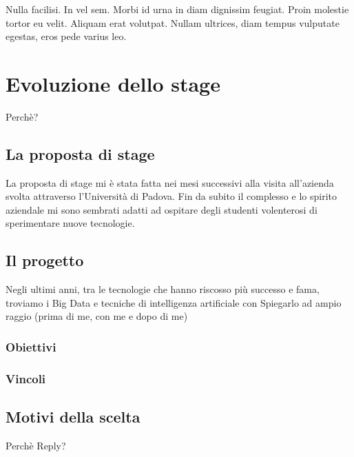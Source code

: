 \begin{savequote}[75mm]
Nulla facilisi. In vel sem. Morbi id urna in diam dignissim feugiat. Proin molestie tortor eu velit. Aliquam erat volutpat. Nullam ultrices, diam tempus vulputate egestas, eros pede varius leo.
\end{savequote}

\chapter{Evoluzione dello stage}
Perchè?
\section{La proposta di stage}
La proposta di stage mi è stata fatta nei mesi successivi alla visita all'azienda svolta attraverso l'Università di Padova. Fin da subito il complesso e lo spirito aziendale mi sono sembrati adatti ad ospitare degli studenti volenterosi di sperimentare nuove tecnologie. 
\section{Il progetto}
Negli ultimi anni, tra le tecnologie che hanno riscosso più successo e fama, troviamo i Big Data e tecniche di intelligenza artificiale con 
Spiegarlo ad ampio raggio (prima di me, con me e dopo di me)
\subsection{Obiettivi}
\subsection{Vincoli}
\section{Motivi della scelta}
Perchè Reply?
